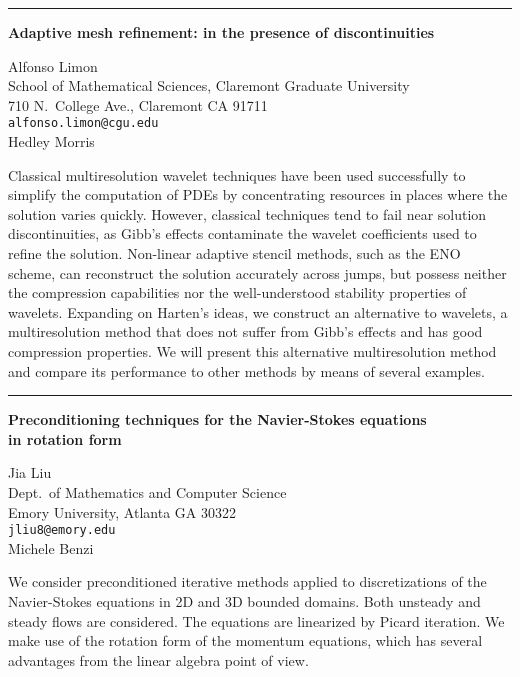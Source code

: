 \documentclass[twosided]{report}
\begin{document}
	\begin{center} \rule{6in}{1pt} \end{center}

\begin{center}
{\large			%
{\bf Adaptive mesh refinement: in the presence of discontinuities}}

	Alfonso Limon \\
	School of Mathematical Sciences, Claremont Graduate University \\
	710 N.~College Ave., Claremont CA 91711 \\
	{\tt alfonso.limon@cgu.edu} \\
	Hedley Morris
\end{center}
Classical multiresolution wavelet techniques have been used
successfully to simplify the computation of PDEs by
concentrating resources in places where the solution varies
quickly. However, classical techniques tend to fail near
solution discontinuities, as Gibb's effects contaminate the
wavelet coefficients used to refine the solution. Non-linear
adaptive stencil methods, such as the ENO scheme, can
reconstruct the solution accurately across jumps, but
possess neither the compression capabilities nor the
well-understood stability properties of wavelets. Expanding
on Harten's ideas, we construct an alternative to wavelets,
a multiresolution method that does not suffer from Gibb's
effects and has good compression properties. We will present
this alternative multiresolution method and compare its
performance to other methods by means of several examples.


	\begin{center} \rule{6in}{1pt} \end{center}

\begin{center}
{\large			%
{\bf Preconditioning techniques for the Navier-Stokes equations \\
	in rotation form}}

	Jia Liu \\
	Dept.~of Mathematics and Computer Science \\
	Emory University, Atlanta GA 30322 \\
	{\tt jliu8@emory.edu} \\
	Michele Benzi
\end{center}
We consider preconditioned iterative methods applied to
discretizations of the Navier-Stokes equations in 2D and 3D
bounded domains. Both unsteady and steady flows are
considered. The equations are linearized by Picard
iteration. We make use of the rotation form of the momentum
equations, which has several advantages from the linear
algebra point of view.
\end{document}

